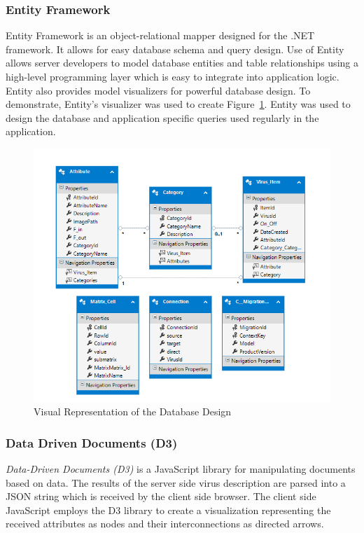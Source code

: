 \subsubsection{Entity Framework}
Entity Framework \cite{Entity} is an object-relational mapper designed for the .NET framework. It allows for easy database schema and query design. Use of Entity allows server developers to model database entities and table relationships using a high-level programming layer which is easy to integrate into application logic. Entity also provides model visualizers for powerful database design. To demonstrate, Entity's visualizer was used to create Figure~\ref{fig:DBModel}. Entity was used to design the database and application specific queries used regularly in the application.

\begin{figure}
	\centering
	\includegraphics[width=1\linewidth]{figures/DBModel}
	\caption[Visual Representation of the Database Design]{Visual Representation of the Database Design}
	\label{fig:DBModel}
\end{figure}
\subsubsection{Data Driven Documents (D3)}
\textit{Data-Driven Documents (D3)} \cite{D3} is a JavaScript library for manipulating documents based on data. The results of the server side virus description are parsed into a JSON string which is received by the client side browser. The client side JavaScript employs the D3 library to create a visualization representing the received attributes as nodes and their interconnections as directed arrows.  
